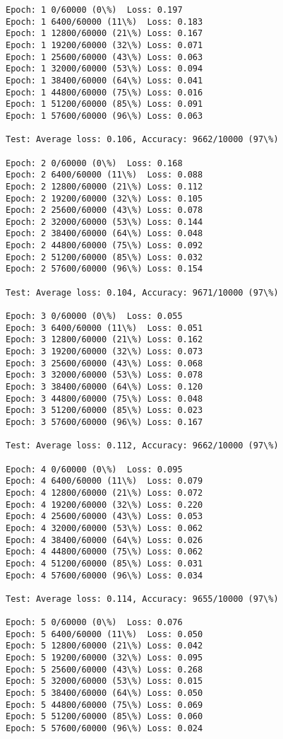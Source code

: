 \documentclass[11pt]{article}
\begin{document}
    \begin{Verbatim}[commandchars=\\\{\}]
Epoch: 1 0/60000 (0\%)	Loss: 0.197
Epoch: 1 6400/60000 (11\%)	Loss: 0.183
Epoch: 1 12800/60000 (21\%)	Loss: 0.167
Epoch: 1 19200/60000 (32\%)	Loss: 0.071
Epoch: 1 25600/60000 (43\%)	Loss: 0.063
Epoch: 1 32000/60000 (53\%)	Loss: 0.094
Epoch: 1 38400/60000 (64\%)	Loss: 0.041
Epoch: 1 44800/60000 (75\%)	Loss: 0.016
Epoch: 1 51200/60000 (85\%)	Loss: 0.091
Epoch: 1 57600/60000 (96\%)	Loss: 0.063

Test: Average loss: 0.106, Accuracy: 9662/10000 (97\%)

Epoch: 2 0/60000 (0\%)	Loss: 0.168
Epoch: 2 6400/60000 (11\%)	Loss: 0.088
Epoch: 2 12800/60000 (21\%)	Loss: 0.112
Epoch: 2 19200/60000 (32\%)	Loss: 0.105
Epoch: 2 25600/60000 (43\%)	Loss: 0.078
Epoch: 2 32000/60000 (53\%)	Loss: 0.144
Epoch: 2 38400/60000 (64\%)	Loss: 0.048
Epoch: 2 44800/60000 (75\%)	Loss: 0.092
Epoch: 2 51200/60000 (85\%)	Loss: 0.032
Epoch: 2 57600/60000 (96\%)	Loss: 0.154

Test: Average loss: 0.104, Accuracy: 9671/10000 (97\%)

Epoch: 3 0/60000 (0\%)	Loss: 0.055
Epoch: 3 6400/60000 (11\%)	Loss: 0.051
Epoch: 3 12800/60000 (21\%)	Loss: 0.162
Epoch: 3 19200/60000 (32\%)	Loss: 0.073
Epoch: 3 25600/60000 (43\%)	Loss: 0.068
Epoch: 3 32000/60000 (53\%)	Loss: 0.078
Epoch: 3 38400/60000 (64\%)	Loss: 0.120
Epoch: 3 44800/60000 (75\%)	Loss: 0.048
Epoch: 3 51200/60000 (85\%)	Loss: 0.023
Epoch: 3 57600/60000 (96\%)	Loss: 0.167

Test: Average loss: 0.112, Accuracy: 9662/10000 (97\%)

Epoch: 4 0/60000 (0\%)	Loss: 0.095
Epoch: 4 6400/60000 (11\%)	Loss: 0.079
Epoch: 4 12800/60000 (21\%)	Loss: 0.072
Epoch: 4 19200/60000 (32\%)	Loss: 0.220
Epoch: 4 25600/60000 (43\%)	Loss: 0.053
Epoch: 4 32000/60000 (53\%)	Loss: 0.062
Epoch: 4 38400/60000 (64\%)	Loss: 0.026
Epoch: 4 44800/60000 (75\%)	Loss: 0.062
Epoch: 4 51200/60000 (85\%)	Loss: 0.031
Epoch: 4 57600/60000 (96\%)	Loss: 0.034

Test: Average loss: 0.114, Accuracy: 9655/10000 (97\%)

Epoch: 5 0/60000 (0\%)	Loss: 0.076
Epoch: 5 6400/60000 (11\%)	Loss: 0.050
Epoch: 5 12800/60000 (21\%)	Loss: 0.042
Epoch: 5 19200/60000 (32\%)	Loss: 0.095
Epoch: 5 25600/60000 (43\%)	Loss: 0.268
Epoch: 5 32000/60000 (53\%)	Loss: 0.015
Epoch: 5 38400/60000 (64\%)	Loss: 0.050
Epoch: 5 44800/60000 (75\%)	Loss: 0.069
Epoch: 5 51200/60000 (85\%)	Loss: 0.060
Epoch: 5 57600/60000 (96\%)	Loss: 0.024


\end{Verbatim}
\end{document}
